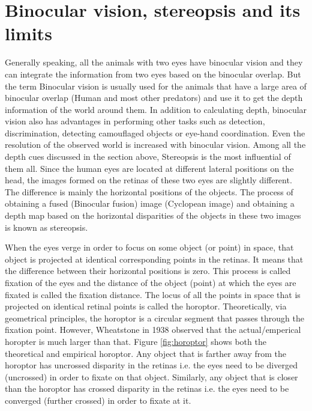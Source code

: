 \section{Binocular vision, stereopsis and its limits}
Generally speaking, all the animals with two eyes have binocular vision and they can integrate the information from two eyes based on the binocular overlap. But the term Binocular vision is usually used for the animals that have a large area of binocular overlap (Human and most other predators) and use it to get the depth information of the world around them. In addition to calculating depth, binocular vision also has advantages in performing other tasks such as detection, discrimination, detecting camouflaged objects or eye-hand coordination. Even the resolution of the observed world is increased with binocular vision\cite{howard1995binocular}. Among all the depth cues discussed in the section above, Stereopsis is the most influential of them all. Since the human eyes are located at different lateral positions on the head, the images formed on the retinas of these two eyes are slightly different. The difference is mainly the horizontal positions of the objects\cite{ wiki:stereopsis}. The process of obtaining a fused (Binocular fusion) image (Cyclopean image) and obtaining a depth map based on the horizontal disparities of the objects in these two images is known as stereopsis.

When the eyes verge in order to focus on some object (or point) in space, that object is projected at identical corresponding points in the retinas. It means that the difference between their horizontal positions is zero. This process is called fixation of the eyes and the distance of the object (point) at which the eyes are fixated is called the fixation distance. The locus of all the points in space that is projected on identical retinal points is called the horoptor\cite{ wiki:horoptor}. Theoretically, via geometrical principles, the horoptor is a circular segment that passes through the fixation point. However, Wheatstone in 1938 observed that the actual/emperical horopter is much larger than that. Figure \ref{fig:horoptor} shows both the theoretical and empirical horoptor. Any object that is farther away from the horoptor has uncrossed disparity in the retinas i.e. the eyes need to be diverged (uncrossed) in order to fixate on that object. Similarly, any object that is closer than the horoptor has crossed disparity in the retinas i.e. the eyes need to be converged (further crossed) in order to fixate at it.

